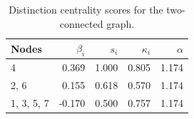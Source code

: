 \begin{table}
\centering
\caption{\label{tab:tc}Distinction centrality scores for the two-connected graph.}
\centering
\begin{tabular}[t]{lrrrr}
\toprule
Nodes & $\beta_i$ & $s_i$ & $\kappa_i$ & $\alpha$\\
\midrule
4 & 0.369 & 1.000 & 0.805 & 1.174\\
2, 6 & 0.155 & 0.618 & 0.570 & 1.174\\
1, 3, 5, 7 & -0.170 & 0.500 & 0.757 & 1.174\\
\bottomrule
\end{tabular}
\end{table}
